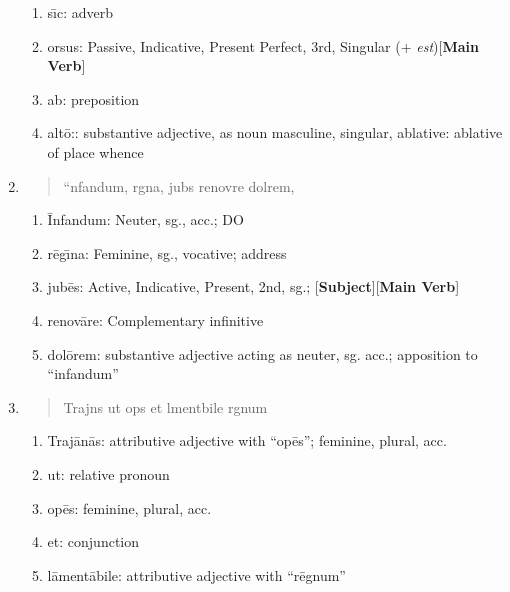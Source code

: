 \documentclass[]{article}
\newcommand{\latify}[1]{
        \Large
        \begin{verse}
          \begin{metrica}
          {#1}\\
          \end{metrica}
        \end{verse}
        \normalsize
}
\begin{document}
\begin{enumerate}
\begin{enumerate}
	\item s\={\i}c:  adverb
	
	\item orsus: Passive, Indicative, Present Perfect, 3rd, Singular (+ \emph{est})[\textbf{Main Verb}]
	
	\item ab:  preposition
	
	\item alt\=o::  substantive adjective, as noun masculine, singular, ablative: ablative of place whence       
	
\end{enumerate}

\item \latify{``{}nfandum, r{}g{\macron {\i}}na, jub{\macron {e}}s renov{\macron {a}}re dol{\macron {o}}rem,}
\begin{enumerate}

	\item \=Infandum:  Neuter, sg., acc.; DO

	\item r\=eg\={\i}na:  Feminine, sg., vocative; address

	\item jub\=es:  Active, Indicative, Present, 2nd, sg.;  [\textbf{Subject}][\textbf{Main Verb}]

	\item renov\=are: Complementary infinitive

	\item dol\=orem:  substantive adjective acting as neuter, sg. acc.; apposition to ``infandum''

\end{enumerate}


\item \latify{Traj{}n{\macron {a}}s ut op{}s et l{\macron {a}}ment{\macron {a}}bile r{\macron {e}}gnum}
\begin{enumerate}

	\item Traj\=an\=as:  attributive adjective with ``op\={e}s''; feminine, plural, acc.

	\item ut:  relative pronoun

	\item op\={e}s:   feminine, plural, acc.

	\item et: conjunction

	\item l\={a}ment\={a}bile: attributive adjective with ``r\={e}gnum''


\end{enumerate}
\end{enumerate}
\end{document}
